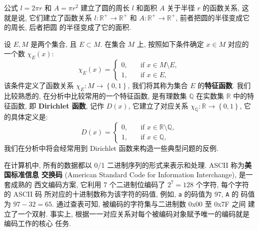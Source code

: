 \documentclass[10pt,UTF8]{book} %
\begin{document}
\begin{example}
    公式 $l=2\pi r$ 和 $A = \pi r^2$ 建立了圆的周长 $l$ 和面积 $A$ 关于半径 $r$
    的函数关系, 这就是说, 它们建立了函数关系 $l: \mathbb{R}^+ \to \mathbb{R}^+$
    和 $A: \mathbb{R}^+ \to \mathbb{R}^+$, 前者把圆的半径变成它的周长, 后者把圆
    的半径变成了它的面积.
\end{example}

\begin{example}
    设 $E,M$ 是两个集合, 且 $E \subset M$. 在集合 $M$ 上, 按照如下条件确定
    $x \in M$ 对应的一个数 $\chi_E (x)$:
    \[ \chi_E(x) = \begin{cases}
        0, \quad & \mathrm{if} \,\, x \in M \setminus E, \\
        1, \quad & \mathrm{if} \,\, x \in E,
    \end{cases} \]
    该条件定义了函数关系 $\chi_E: M \to \left\{ 0,1 \right\}$, 我们将其称为集合
    $E$ 的\textbf{特征函数}. 我们比较熟悉的, 在分析中比较常用的一个特征函数, 是有理数集
    $\mathbb{Q}$ 在实数集 $\mathbb{R}$ 中的特征函数, 即 \textbf{Dirichlet 函数},
    记作 $D(x)$, 它建立了对应关系 $\chi_\mathbb{Q}: 
    \mathbb{R} \to \left\{ 0,1 \right\}$, 它的具体定义是:
    \[ D(x) = \begin{cases}
        0, \quad & \mathrm{if} \,\, x \in \mathbb{R} \setminus \mathbb{Q}, \\
        1, \quad & \mathrm{if} \,\, x \in \mathbb{Q},
    \end{cases} \]
    我们在分析中将会经常用到 Dirichlet 函数来构造一些典型问题的反例.
\end{example}

\begin{example}
    在计算机中, 所有的数据都以 0/1 二进制序列的形式来表示和处理. ASCII 称为\textbf{美国标准信息
    交换码} (American Standard Code for Information Interchange), 是一套成熟的
    西文编码方案, 它利用 7 个二进制位编码了 $2^7 = 128$ 个字符, 每个字符的 ASCII 码
    所对应的十进制数称为该字符的码值, 例如, \lstinline|a| 的码值为 97, \lstinline|A| 的
    码值为 $97 - 32 = 65$. 通过查表可知, 被编码的字符集与二进制数 0x00 至 0x7F 之间
    建立了一个双射. 事实上, 根据一一对应关系对每个被编码对象赋予唯一的编码就是编码工作的核心
    任务.
\end{example}
\end{document}
